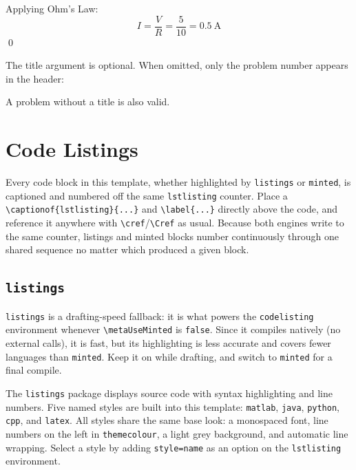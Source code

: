 	\begin{solution}
		Applying Ohm's Law:
		\begin{equation}
			I = \frac{V}{R} = \frac{5}{10} = \SI{0.5}{\ampere}
		\end{equation}
		\qed
	\end{solution}
	
	The title argument is optional. When omitted, only the problem number appears in the header:
	
	\begin{problem}
		\label{prob:problem}
		A problem without a title is also valid.
	\end{problem}

\section{Code Listings}

Every code block in this template, whether highlighted by \texttt{listings} or \texttt{minted}, is captioned and numbered off the same \texttt{lstlisting} counter. Place a \texttt{\textbackslash captionof\{lstlisting\}\{...\}} and \texttt{\textbackslash label\{...\}} directly above the code, and reference it anywhere with \texttt{\textbackslash cref}/\texttt{\textbackslash Cref} as usual. Because both engines write to the same counter, listings and minted blocks number continuously through one shared sequence no matter which produced a given block.

	\subsection{\texttt{listings}}
	\noindent\colorbox{themecolour!15}{\parbox{\linewidth}{\small \texttt{listings} is a drafting-speed fallback: it is what powers the \texttt{codelisting} environment whenever \texttt{\textbackslash metaUseMinted} is \texttt{false}. Since it compiles natively (no external calls), it is fast, but its highlighting is less accurate and covers fewer languages than \texttt{minted}. Keep it on while drafting, and switch to \texttt{minted} for a final compile.}}\vspace{0.5\baselineskip}
	
	The \texttt{listings} package displays source code with syntax highlighting and line numbers. Five named styles are built into this template: \texttt{matlab}, \texttt{java}, \texttt{python}, \texttt{cpp}, and \texttt{latex}. All styles share the same base look: a monospaced font, line numbers on the left in \texttt{themecolour}, a light grey background, and automatic line wrapping. Select a style by adding \texttt{style=name} as an option on the \texttt{lstlisting} environment.
	
